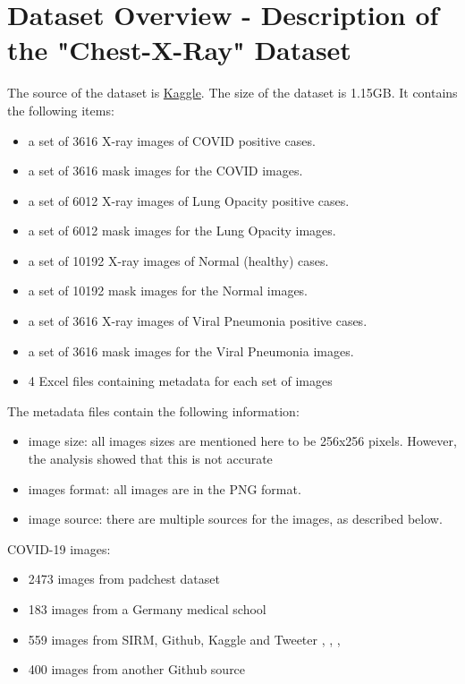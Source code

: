 \documentclass{article}
\begin{document}
\section{Dataset Overview - Description of the "Chest-X-Ray" Dataset}
The source of the dataset is \href{https://www.kaggle.com/tawsifurrahman/covid19-radiography-database} {Kaggle}. The size of the dataset is 1.15GB. It contains the following items:
\begin{itemize}
    \item a set of 3616  X-ray images of COVID positive cases.
    \item a set of 3616 mask images for the COVID images.
    \item a set of 6012  X-ray images of Lung Opacity positive cases.
    \item a set of 6012 mask images for the Lung Opacity images.
    \item a set of 10192  X-ray images of Normal (healthy) cases.
    \item a set of 10192 mask images for the Normal images.
    \item a set of 3616  X-ray images of Viral Pneumonia positive cases.
    \item a set of 3616 mask images for the Viral Pneumonia images.
    \item  4 Excel files containing metadata for each set of images
\end{itemize}

The metadata files contain the following information:
\begin{itemize}
    \item image size: all images sizes are mentioned here to be 256x256 pixels. However, the analysis showed that this is not accurate
    \item images format: all images are in the PNG format.
    \item image source: there are multiple sources for the images, as described below.
\end{itemize}

COVID-19 images:
\begin{itemize}
    \item 2473 images from padchest dataset \cite{url_1}
    \item 183 images from a Germany medical school \cite{url_2}
    \item 559 images from SIRM, Github, Kaggle and Tweeter \cite{url_3}, \cite{url_4}, \cite{url_5}, \cite{url_6}
    \item 400 images from another Github source \cite{url_7}
\end{itemize}
\end{document}
